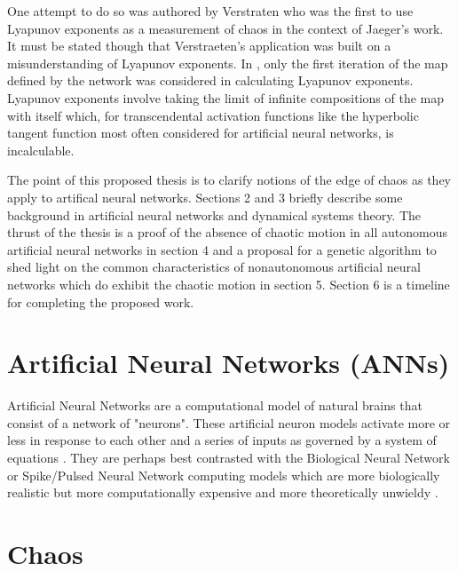 \documentclass[12pt]{article}
\begin{document}
One attempt to do so was authored by Verstraten \cite{verstraeten}
who was the first
to use Lyapunov exponents as a measurement of chaos in the context of Jaeger's
work.  It must be stated though that Verstraeten's application was built on a
misunderstanding of Lyapunov exponents.  In \cite{verstraeten}, 
only the first iteration
of the map defined by the network was considered in calculating Lyapunov 
exponents.  Lyapunov exponents involve taking the limit of infinite 
compositions of the map with itself which, for transcendental activation 
functions like the hyperbolic tangent function most often considered for 
artificial neural networks, is incalculable.

The point of this proposed thesis is to clarify notions of the edge of chaos
as they apply to artifical neural networks.  Sections 2 and 3 briefly describe
some background in artificial neural networks and dynamical systems theory.  
The thrust of the thesis is a proof of the absence
of chaotic motion in all autonomous artificial neural networks in section 4
and a proposal for a genetic algorithm to shed light on the common 
characteristics of nonautonomous artificial neural networks which do exhibit
the chaotic motion in section 5.  Section 6 is a timeline for completing the
proposed work.

\section{Artificial Neural Networks (ANNs)}
Artificial Neural Networks are a computational model of natural brains that
consist of a network of "neurons".  These artificial neuron models activate 
more or less in response to
each other and a series of inputs as governed by a system of equations \cite{jaeger_original, doya, dayan}.
They are perhaps best contrasted with
the Biological Neural Network or Spike/Pulsed Neural Network computing models
which are more biologically realistic but more computationally expensive and
more theoretically unwieldy \cite{maass_book, fitzhugh, izhikevich_book}.


\section{Chaos}
\end{document}

